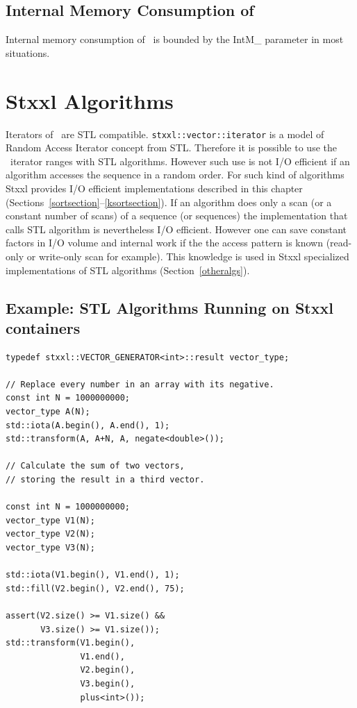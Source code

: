 \documentclass[twoside]{book}
\newcommand{\stxxl}{{\sc Stxxl} }
\begin{document}
\subsection{Internal Memory Consumption of \xpqueue}
Internal memory consumption of \xpqueue\ is bounded by the IntM\_
parameter in most situations.

\newcommand{\xsort}{{\texttt{stxxl::sort}}}
\newcommand{\xksort}{{\texttt{stxxl::ksort}}}
\newcommand{\stdsort}{{\texttt{std::sort}}}



\section{\stxxl Algorithms}
Iterators of \xvector\ are STL
compatible. \texttt{stxxl::vector::iterator} is a model of Random
Access Iterator concept from STL. Therefore it is possible to use the
\xvector\ iterator ranges with STL algorithms. However such use is not
I/O efficient if an algorithm accesses the sequence in a random order.
For such kind of algorithms \stxxl provides I/O efficient
implementations described in this chapter
(Sections~\ref{sortsection}--\ref{ksortsection}). 
If an algorithm does only a scan (or a constant number of scans) of
a sequence (or sequences) the implementation that calls STL algorithm
is nevertheless I/O efficient. However one can save constant factors
in I/O volume 
and internal work if the the access pattern is known (read-only or
write-only scan for example). This knowledge is used in \stxxl
specialized implementations of STL algorithms
(Section~\ref{otheralgs}).

\subsection*{Example: STL Algorithms Running on \stxxl containers}
\begin{lstlisting}
typedef stxxl::VECTOR_GENERATOR<int>::result vector_type;

// Replace every number in an array with its negative.
const int N = 1000000000;
vector_type A(N);
std::iota(A.begin(), A.end(), 1);
std::transform(A, A+N, A, negate<double>());

// Calculate the sum of two vectors, 
// storing the result in a third vector.

const int N = 1000000000;
vector_type V1(N);
vector_type V2(N);
vector_type V3(N);

std::iota(V1.begin(), V1.end(), 1);
std::fill(V2.begin(), V2.end(), 75);

assert(V2.size() >= V1.size() && 
       V3.size() >= V1.size());
std::transform(V1.begin(), 
               V1.end(), 
               V2.begin(), 
               V3.begin(),
               plus<int>());
\end{lstlisting}
\end{document}
